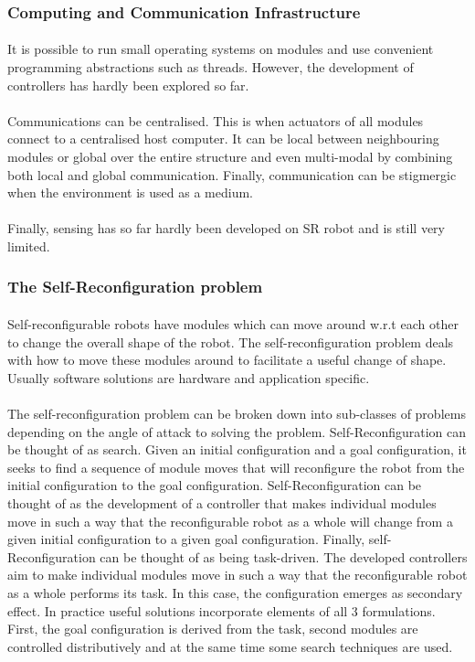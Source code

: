 \subsubsection{Computing and Communication Infrastructure}
\paragraph{}It is possible to run small operating systems on modules and use convenient programming abstractions such as threads. However, the development of controllers has hardly been explored so far. 
\paragraph{}Communications can be centralised. This is when actuators of all modules connect to a centralised host computer. It can be local between neighbouring modules or global over the entire structure and even multi-modal by combining both local and global communication. Finally, communication can be stigmergic when the environment is used as a medium.
\paragraph{}Finally, sensing has so far hardly been developed on SR robot and is still very limited.
\subsubsection{The Self-Reconfiguration problem}
\paragraph{}Self-reconfigurable robots have modules which can move around w.r.t each other to change the overall shape of the robot. The self-reconfiguration problem deals with how to move these modules around to facilitate a useful change of shape. Usually software solutions are hardware and application specific.
\paragraph{}The self-reconfiguration problem can be broken down into sub-classes of problems depending on the angle of attack to solving the problem.  Self-Reconfiguration can be thought of as search. Given an initial configuration and a goal configuration, it seeks to find a sequence of module moves that will reconfigure the robot from the initial configuration to the goal configuration.  Self-Reconfiguration can be thought of as the development of a controller that makes individual modules move in such a way that the reconfigurable robot as a whole will change from a given initial configuration to a given goal configuration. Finally, self-Reconfiguration can be thought of as being task-driven. The developed controllers aim to make individual modules move in such a way that the reconfigurable robot as a whole performs its task. In this case, the configuration emerges as secondary effect. In practice useful solutions incorporate elements of all 3 formulations. First, the goal configuration is derived from the task, second modules are controlled distributively and at the same time some search techniques are used.
